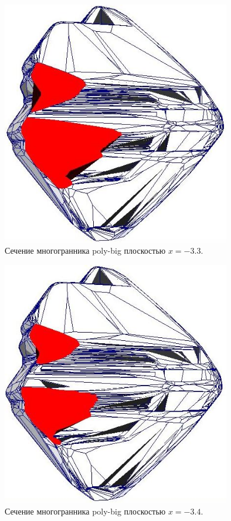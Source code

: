 \documentclass[a4paper,12pt, titlepage]{article}
\begin{document}
	\begin{flushleft}
		\begin{figure}[p]
		    \includegraphics[width=10cm]{poly-big/intersect2.jpeg}
		    \caption{Сечение многогранника poly-big плоскостью $x = -3.3$.}
		    \label{poly-big-3}
		\end{figure}

	\end{flushleft}
	\begin{flushleft}
		\begin{figure}[p]
		    \includegraphics[width=10cm]{poly-big/intersect3.jpeg}
		    \caption{Сечение многогранника poly-big плоскостью $x = -3.4$.}
		    \label{poly-big-4}
		\end{figure}
	\end{flushleft}
\end{document}
